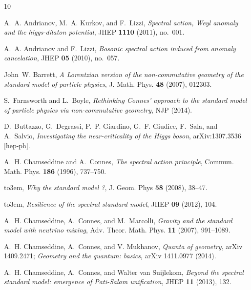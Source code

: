 \documentclass[11pt]{article}
\begin{document}
\setcounter{section}{0}

\def\baselinestretch{.5}
\providecommand{\bysame}{\leavevmode\hbox to3em{\hrulefill}\thinspace}
\providecommand{\MR}{\relax\ifhmode\unskip\space\fi MR }
\providecommand{\MRhref}[2]{%
  \href{http://www.ams.org/mathscinet-getitem?mr=#1}{#2}
}
\providecommand{\href}[2]{#2}
\begin{thebibliography}{10}

A.~A. Andrianov, M.~A. Kurkov, and F.~Lizzi, \emph{Spectral action, Weyl
  anomaly and the higgs-dilaton potential}, JHEP \textbf{1110} (2011), no.~001.

A.~A. Andrianov and F.~Lizzi, \emph{Bosonic spectral action induced from
  anomaly cancelation}, JHEP \textbf{05} (2010), no.~057.

John~W. Barrett, \emph{A {L}orentzian version of the non-commutative geometry
  of the standard model of particle physics}, J. Math. Phys. \textbf{48}
  (2007), 012303.

S.~Farnsworth and L.~Boyle, \emph{Rethinking {C}onnes' approach to the standard
  model of particle physics via non-commutative geometry}, NJP (2014).

D.~Buttazzo, G.~Degrassi, P.~P. Giardino, G.~F. Giudice, F.~Sala, and
  A.~Salvio, \emph{Investigating the near-criticality of the {H}iggs boson},
  arXiv:1307.3536 [hep-ph].

A.~H. Chamseddine and A.~Connes, \emph{The spectral action principle}, Commun.
  Math. Phys. \textbf{186} (1996), 737--750.

\bysame, \emph{Why the standard model ?}, J. Geom. Phys \textbf{58} (2008),
  38--47.

\bysame, \emph{Resilience of the spectral standard model}, JHEP \textbf{09}
  (2012), 104.

A.~H. Chamseddine, A.~Connes, and M.~Marcolli, \emph{Gravity and the standard
  model with neutrino mixing}, Adv. Theor. Math. Phys. \textbf{11} (2007),
  991--1089.

A.~H. Chamseddine, A.~Connes, and V. Mukhanov, \emph{Quanta of
  geometry},  arXiv 1409.2471; \emph{Geometry and the quantum: basics}, arXiv 1411.0977 (2014).

A.~H. Chamseddine, A.~Connes, and Walter van Suijlekom, \emph{Beyond the
  spectral standard model: emergence of {P}ati-{S}alam unification}, JHEP
  \textbf{11} (2013), 132.


\end{thebibliography}
\end{document}
